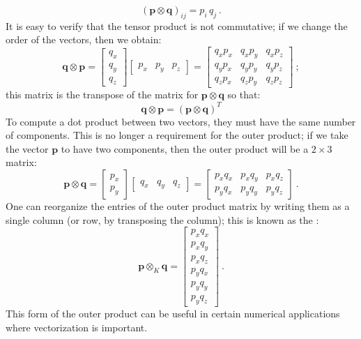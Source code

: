 \begin{equation}
	(\mathbf{p}\otimes\mathbf{q})_{ij} = p_i\, q_j\ .
\end{equation}
It is easy to verify that the tensor product is not commutative; if we change the order of the vectors, then we obtain:
\begin{equation}
	\mathbf{q}\otimes\mathbf{p} = \begin{bmatrix}q_x\\ q_y\\ q_z\end{bmatrix}\begin{bmatrix}p_x& p_y& p_z\end{bmatrix}= \begin{bmatrix}q_xp_x&q_xp_y&q_xp_z\\ q_yp_x&q_yp_y&q_yp_z\\ q_zp_x&q_zp_y&q_zp_z\end{bmatrix}\ ;
\end{equation}
this matrix is the transpose of the matrix for $\mathbf{p}\otimes\mathbf{q}$ so that:
\begin{equation}
	\mathbf{q}\otimes\mathbf{p} = (\mathbf{p}\otimes\mathbf{q})^T
\end{equation}
To compute a dot product between two vectors, they must have the same number of components. This is no longer a requirement for the outer product; if we take the vector $\mathbf{p}$ to have two components, then the outer product will be a $2\times 3$ matrix:
\begin{equation}
	\mathbf{p}\otimes\mathbf{q} = \begin{bmatrix}p_x\\ p_y\end{bmatrix}\begin{bmatrix}q_x& q_y& q_z\end{bmatrix}= \begin{bmatrix}p_xq_x&p_xq_y&p_xq_z\\ p_yq_x&p_yq_y&p_yq_z\end{bmatrix}\ .
\end{equation}
One can reorganize the entries of the outer product matrix by writing them as a single column (or row, by transposing the column); this is known as the :
\begin{equation}
	\mathbf{p}\otimes_K\mathbf{q} = \begin{bmatrix}p_xq_x\\ p_xq_y\\ p_xq_z\\ p_yq_x\\ p_yq_y\\ p_yq_z\end{bmatrix}\ .
\end{equation}
This form of the outer product can be useful in certain numerical applications where vectorization is important.

